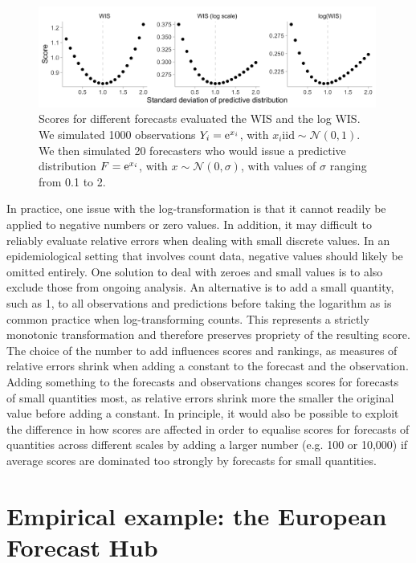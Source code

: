 \documentclass{article}
\begin{document}
\begin{figure}[h!]
    \centering
    \includegraphics[width=0.99\textwidth]{output/figures/example-log-first.png}
    \caption{Scores for different forecasts evaluated the WIS and the log WIS. We simulated 1000 observations $Y_i = {\rm e}^{x_i}$, with $x_i \text{iid} \sim \mathcal{N}(0, 1)$. We then simulated 20 forecasters who would issue a predictive distribution $F = {\rm e}^{x_i}$, with $x \sim \mathcal{N}(0, \sigma)$, with values of $\sigma$ ranging from 0.1 to 2.}
    \label{fig:log-improper}
\end{figure}

In practice, one issue with the log-transformation is that it cannot readily be applied to negative numbers or zero values. In addition, it may difficult to reliably evaluate relative errors when dealing with small discrete values. In an epidemiological setting that involves count data, negative values should likely be omitted entirely. One solution to deal with zeroes and small values is to also exclude those from ongoing analysis. An alternative is to add a small quantity, such as 1, to all observations and predictions before taking the logarithm as is common practice when log-transforming counts. This represents a strictly monotonic transformation and therefore preserves propriety of the resulting score. The choice of the number to add influences scores and rankings, as measures of relative errors shrink when adding a constant to the forecast and the observation. Adding something to the forecasts and observations changes scores for forecasts of small quantities most, as relative errors shrink more the smaller the original value before adding a constant. In principle, it would also be possible to exploit the difference in how scores are affected in order to equalise scores for forecasts of quantities across different scales by adding a larger number (e.g. 100 or 10,000) if average scores are dominated too strongly by forecasts for small quantities. 



\section{Empirical example: the European Forecast Hub}
\end{document}
